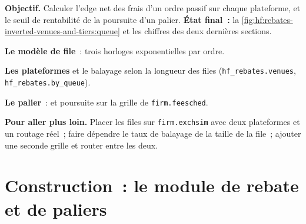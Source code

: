 \begin{tutorial}
\textbf{Objectif.} Calculer l'edge net des frais d'un ordre passif sur chaque plateforme, et le seuil de rentabilité de la poursuite d'un palier. \textbf{État final~:}
la \cref{fig:hf:rebates-inverted-venues-and-tiers:queue} et les chiffres des deux dernières sections.
\begin{tutsteps}
\item \textbf{Le modèle de file}~: trois horloges exponentielles par ordre.
\label{lst:hf:rebates-inverted-venues-and-tiers:queue}
\item \textbf{Les plateformes} et le balayage selon la longueur des files (\texttt{hf\_rebates.venues}, \texttt{hf\_rebates.by\_queue}).
\item \textbf{Le palier}~:  et poursuite sur la grille de \texttt{firm.feesched}.
\label{lst:hf:rebates-inverted-venues-and-tiers:chase}
\end{tutsteps}
\textbf{Pour aller plus loin.} Placer les files sur \texttt{firm.exchsim} avec deux plateformes et un routage réel~; faire dépendre le taux de balayage de la
taille de la file~; ajouter une seconde grille et router entre les deux.
\end{tutorial}

\section{Construction~: le module de rebate et de paliers}\label{bld:hf:rebates-inverted-venues-and-tiers:rebatemm}

